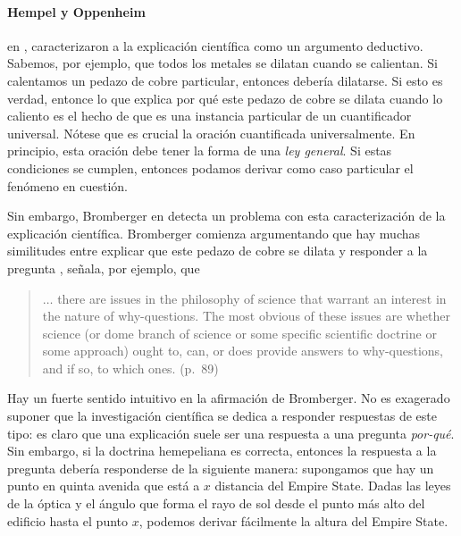 \paragraph{Hempel y Oppenheim} en ,
caracterizaron a la explicación científica como un argumento
deductivo. Sabemos, por ejemplo, que todos los metales se dilatan
cuando se calientan. Si calentamos un pedazo de cobre particular,
entonces debería dilatarse. Si esto es verdad, entonce lo que
explica por qué este pedazo de cobre se dilata cuando lo caliento es
el hecho de que es una instancia particular de un cuantificador
universal. Nótese que es crucial la oración cuantificada
universalmente. En principio, esta oración debe tener la forma de
una \emph{ley general}. Si estas condiciones se cumplen, entonces
podamos derivar como caso particular el fenómeno en
cuestión.

Sin embargo, Bromberger en  detecta un
problema con esta caracterización de la explicación científica.
Bromberger comienza argumentando que hay muchas similitudes entre
explicar que este pedazo de cobre se dilata y responder a la
pregunta , señala, por ejemplo, que

\begin{quote}
	$\ldots$ there are issues in the philosophy of science that
	warrant an interest in the nature of why-questions. The most
	obvious of	these issues are whether science (or dome branch of
	science or	some specific scientific doctrine or some approach)
	ought to,	can, or does provide answers to why-questions, and if
	so, to	which ones. (p.~89)
\end{quote}


Hay un fuerte sentido intuitivo en la afirmación de Bromberger. No
es exagerado suponer que la investigación científica se dedica a
responder respuestas de este tipo: es claro que una explicación suele ser una respuesta a una
pregunta \emph{por-qué}. Sin embargo, si la doctrina hemepeliana es
correcta, entonces la  respuesta a la pregunta  debería responderse de la
siguiente manera: supongamos que hay un punto en quinta avenida que
está a $x$ distancia del Empire State. Dadas las leyes de la óptica
y el ángulo que forma el rayo de sol desde el punto más alto del
edificio hasta el punto $x$, podemos derivar fácilmente la altura
del Empire State.

